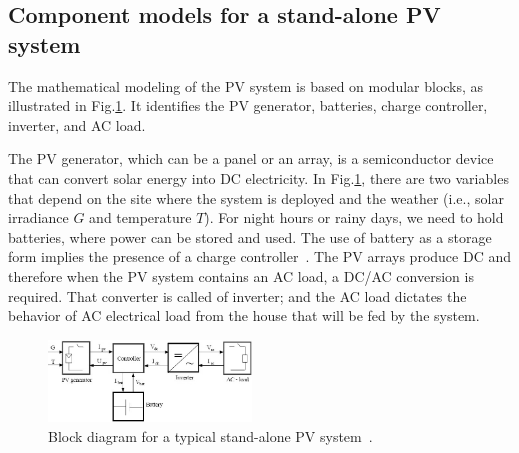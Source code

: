 \documentclass[journal]{IEEEtran}
\begin{document}
\subsection{Component models for a stand-alone PV system }

The mathematical modeling of the PV system is based on modular blocks, as illustrated in Fig.\ref{fig:blockdiagram}. It identifies the PV generator, batteries, charge controller, inverter, and AC load. 

The PV generator, which can be a panel or an array, is a semiconductor device that can convert solar energy into DC electricity. In Fig.\ref{fig:blockdiagram}, there are two variables that depend on the site where the system is deployed and the weather (i.e., solar irradiance $G$ and temperature $T$). For night hours or rainy days, we need to hold batteries, where power can be stored and used. The use of battery as a storage form implies the presence of a charge controller~\cite{Hansen,Mellit}. The PV arrays produce DC and therefore when the PV system contains an AC load, a DC/AC conversion is required. That converter is called of inverter; and the AC load dictates the behavior of AC electrical load from the house that will be fed by the system.
%
%
\begin{figure}[h]
\includegraphics[width=0.48\textwidth]{blockdiagramPVS2}
\centering
\caption{Block diagram for a typical stand-alone PV system~\cite{Hansen}.}
\label{fig:blockdiagram}
\end{figure}


\end{document}
